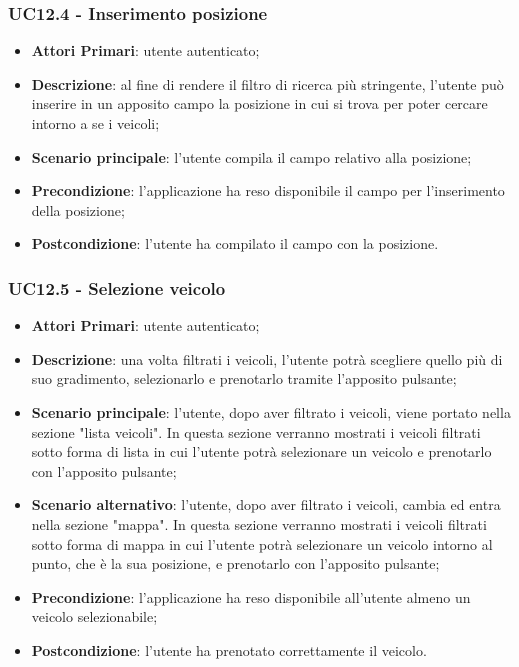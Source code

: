 \subsubsection{UC12.4 - Inserimento posizione}
\begin{itemize}
	\item \textbf{Attori Primari}: utente autenticato;
	\item \textbf{Descrizione}: al fine di rendere il filtro di ricerca più stringente, l'utente può inserire in un apposito campo la posizione in cui si trova per poter cercare intorno a se i veicoli;
	\item \textbf{Scenario principale}: l'utente compila il campo relativo alla posizione;	
	\item \textbf{Precondizione}: l'applicazione ha reso disponibile il campo per l'inserimento della posizione;
	\item \textbf{Postcondizione}: l'utente ha compilato il campo con la posizione.	
\end{itemize}
\subsubsection{UC12.5 - Selezione veicolo}
\begin{itemize}
	\item \textbf{Attori Primari}: utente autenticato;
	\item \textbf{Descrizione}: una volta filtrati i veicoli, l'utente potrà scegliere quello più di suo gradimento, selezionarlo e prenotarlo tramite l'apposito pulsante;
	\item \textbf{Scenario principale}: 
	l'utente, dopo aver filtrato i veicoli, viene portato nella sezione "lista veicoli". In questa sezione verranno mostrati i veicoli filtrati sotto forma di lista in cui l'utente potrà selezionare un veicolo e prenotarlo con l'apposito pulsante;
	\item \textbf{Scenario alternativo}: l'utente, dopo aver filtrato i veicoli, cambia ed entra nella sezione "mappa". In questa sezione verranno mostrati i veicoli filtrati sotto forma di mappa in cui l'utente potrà selezionare un veicolo intorno al punto, che è la sua posizione, e prenotarlo con l'apposito pulsante;
	\item \textbf{Precondizione}: l'applicazione ha reso disponibile all'utente almeno un veicolo selezionabile;
	\item \textbf{Postcondizione}: l'utente ha prenotato correttamente il veicolo.
\end{itemize}


